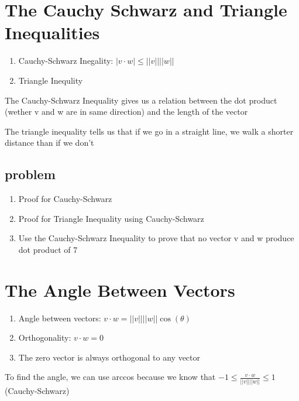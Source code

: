 \documentclass{article}
\begin{document}
\section{The Cauchy Schwarz and Triangle Inequalities}

\begin{enumerate}
    \item Cauchy-Schwarz Inegality: $ |v \cdot w| \leq || v|| ||w|| $
    \item Triangle Inequlity
\end{enumerate}

\begin{remark}
    The Cauchy-Schwarz Inequality gives us a relation between the
    dot product (wether v and w are in same direction) and the length
    of the vector
\end{remark}

\begin{remark}
    The triangle inequality tells us that if we go in a straight line,
    we walk a shorter distance than if we don't
\end{remark}

\subsection{problem}
\begin{enumerate}
    \item Proof for Cauchy-Schwarz
    \item Proof for Triangle Inequality using Cauchy-Schwarz
    \item Use the Cauchy-Schwarz Inequality to prove that no vector v and
	w produce dot product of 7
\end{enumerate}

\section{The Angle Between Vectors}

\begin{enumerate}
    \item Angle between vectors: $ v \cdot w = || v|| ||w|| \cos(\theta) $
    \item Orthogonality: $ v \cdot w = 0 $
    \item The zero vector is always orthogonal to any vector
\end{enumerate}

\begin{remark}
    To find the angle, we can use arccos because we know that
    $ -1 \leq \frac{v \cdot w}{||v|| ||w||} \leq 1 $ (Cauchy-Schwarz)
\end{remark}
\end{document}
